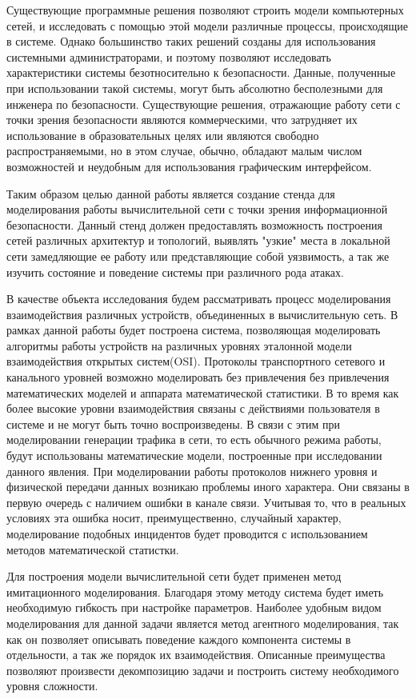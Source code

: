   Существующие программные решения позволяют строить модели компьютерных сетей, и исследовать с помощью этой модели различные процессы, происходящие в системе. Однако большинство таких решений созданы для использования системными администраторами, и поэтому позволяют исследовать характеристики системы безотносительно к безопасности. Данные, полученные при использовании такой системы, могут быть абсолютно бесполезными для инженера по безопасности. Существующие решения, отражающие работу сети с точки зрения безопасности являются коммерческими, что затрудняет их использование в образовательных целях или являются свободно распространяемыми, но в этом случае, обычно, обладают малым числом возможностей и неудобным для использования графическим интерфейсом.

  Таким образом целью данной работы является создание стенда для моделирования работы вычислительной сети с точки зрения информационной безопасности. Данный стенд должен предоставлять возможность построения сетей различных архитектур и топологий, выявлять "узкие" места в локальной сети замедляющие ее работу или представляющие собой уязвимость, а так же изучить состояние и поведение системы при различного рода атаках.

  В качестве объекта исследования будем рассматривать процесс моделирования взаимодействия различных устройств, объединенных в вычислительную сеть. В рамках данной работы будет построена система, позволяющая моделировать алгоритмы работы устройств на различных уровнях эталонной модели взаимодействия открытых систем(OSI). Протоколы транспортного сетевого и канального уровней возможно моделировать без привлечения без привлечения математических моделей и аппарата математической статистики. В то время как более высокие уровни взаимодействия связаны с действиями пользователя в системе и не могут быть точно воспроизведены. В связи с этим при моделировании генерации трафика в сети, то есть обычного режима работы, будут использованы математические модели, построенные при исследовании данного явления. При моделировании работы протоколов нижнего уровня и физической передачи данных возникаю проблемы иного характера. Они связаны в первую очередь с наличием ошибки в канале связи. Учитывая то, что в реальных условиях эта ошибка носит, преимущественно, случайный характер, моделирование подобных инцидентов будет проводится с использованием методов математической статистки.

  Для построения модели вычислительной сети будет применен метод имитационного моделирования. Благодаря этому методу система будет иметь необходимую гибкость при настройке параметров. Наиболее удобным видом моделирования для данной задачи является метод агентного моделирования, так как он позволяет описывать поведение каждого компонента системы в отдельности, а так же порядок их взаимодействия. Описанные преимущества позволяют произвести декомпозицию задачи и построить систему необходимого уровня сложности.

